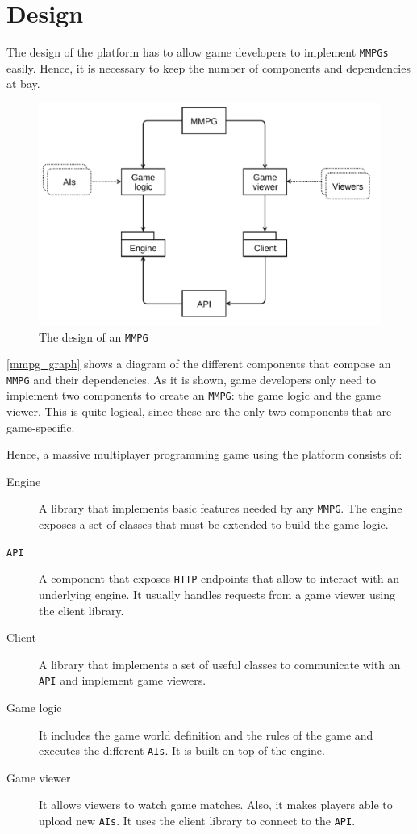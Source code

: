 \documentclass[a4paper,11pt,titlepage,abstract,numbers=noenddot,automark,mnsy,intlimits,rgb,dvipsnames]{report}
\begin{document}
\chapter{Design}
\label{design}
The design of the platform has to allow game developers to implement \texttt{MMPGs} easily. Hence, it is necessary to keep
the number of components and dependencies at bay.
\begin{figure}[H]
\begin{center}
\includegraphics[scale=0.5]{graphs/mmpg_design.pdf}
\end{center}
\caption{The design of an \texttt{MMPG}}
\label{mmpg_graph}
\end{figure}
\autoref{mmpg_graph} shows a diagram of the different components that compose an \texttt{MMPG} and their dependencies. As it is shown,
game developers only need to implement two components to create an \texttt{MMPG}: the game logic and the game viewer. This is
quite logical, since these are the only two components that are game-specific.

Hence, a massive multiplayer programming game using the platform consists of:
\begin{description}
\item[Engine]
A library that implements basic features needed by any \texttt{MMPG}. The engine exposes a set
  of classes that must be extended to build the game logic.
\item[\texttt{API}]
A component that exposes \texttt{HTTP} endpoints that allow to interact with an underlying engine. It
  usually handles requests from a game viewer using the client library.
\item[Client]
A library that implements a set of useful classes to communicate with an \texttt{API} and implement
  game viewers.
\item[Game logic]
It includes the game world definition and the rules of the game and executes the different \texttt{AIs}.
  It is built on top of the engine.
\item[Game viewer]
It allows viewers to watch game matches. Also, it makes players able to upload new \texttt{AIs}. It uses
  the client library to connect to the \texttt{API}.
\end{description}
\clearpage
\end{document}
